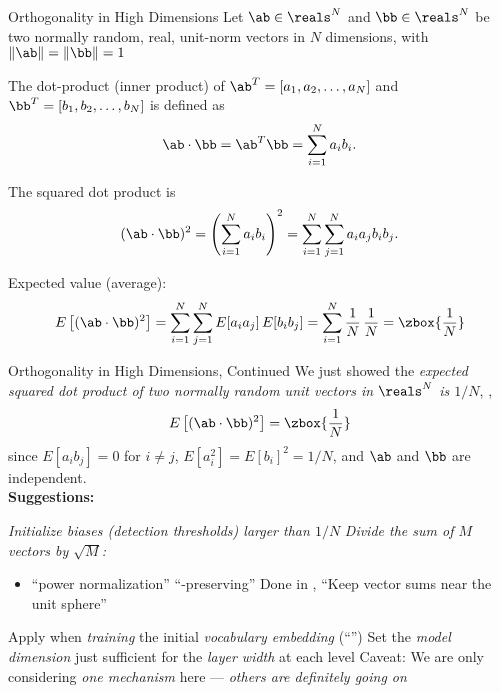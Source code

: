 
\begin{slide}[\slideopts,toc={Orthogonality}]{Orthogonality in High Dimensions}
\vspace{-1em}
% 
Let $\ab\in\reals^N$ and $\bb\in\reals^N$ be two normally random, real, unit-norm vectors in $N$ dimensions,
with $\|\ab\|=\|\bb\|=1$

\maybepause
The dot-product (inner product) of
$\ab^T=[a_1,a_2,\ldots,a_N]$ and
$\bb^T=[b_1,b_2,\ldots,b_N]$ is defined as
\[
\ab \cdot \bb = \ab^T\bb = \sum_{i=1}^{N} a_i b_i.
\]

\maybepause
The squared dot product is
\[
(\ab \cdot \bb)^2 = \left(\sum_{i=1}^{N} a_i b_i\right)^2 = \sum_{i=1}^{N} \sum_{j=1}^{N} a_i a_j b_i b_j.
\]

\maybepause
Expected value (average):
\[
E\left[(\ab \cdot \bb)^2\right]
= \sum_{i=1}^{N} \sum_{j=1}^{N} E[a_i a_j] \, E[b_i b_j]
= \sum_{i=1}^{N} \frac{1}{N}\,\frac{1}{N}
= \zbox{\frac{1}{N}}
\]
\end{slide}

\begin{slide}[\slideopts,toc={}]{Orthogonality in High Dimensions, Continued}
\vspace{-1em}
We just showed the \emph{expected squared dot product of two normally random unit vectors in $\reals^N$ is $1/N$}, \ie,
\[
E\left[(\ab \cdot \bb)^2\right] = \zbox{\frac{1}{N}}
\]
since $E[a_i b_j]=0$ for $i \ne j$, $E[a_i^2] = E[b_i]^2 = 1/N$, and $\ab$ and $\bb$ are independent.\\
\maybepause
\textbf{Suggestions:}
\begin{itemize}
\mpitem \emph{Initialize biases (detection thresholds) larger than $1/N$}
\mpitem \emph{Divide the sum of $M$ vectors by $\sqrt{M}$:}
\begin{itemize}
  \item ``power normalization''
  \mpitem ``-preserving''
  \mpitem Done in , \eg
  \mpitem ``Keep vector sums near the unit sphere''
\end{itemize}
\mpitem Apply  when \emph{training} the initial \emph{vocabulary embedding} (``'')
\mpitem Set the \emph{model dimension} just sufficient for the \emph{layer width} at each level
\mpitem Caveat: We are only considering \emph{one mechanism} here --- \emph{others are definitely going on}
\end{itemize}

\end{slide}

